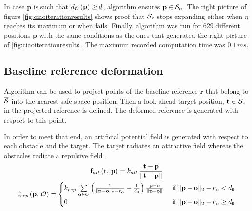 In case $\mathbf{p}$ is such that $d_{\mathcal{O}}\left(\mathbf{p}\right)\geq \underline{d}$, algorithm  ensures $\mathbf{p} \in \mathcal{S}_{\mathbf{c}}$. The right picture of figure \ref{fig:ciaoiterationresults} shows proof that $\mathcal{S}_{\mathbf{c}}$ stops expanding either when $\eta$ reaches its maximum or when  fails. Finally, algorithm  was run for 629 different positions $\mathbf{p}$ with the same conditions as the ones that generated the right picture of \ref{fig:ciaoiterationresults}. The maximum recorded computation time was $0.1\,ms$.

\subsection{Baseline reference deformation}

Algorithm  can be used to project points of the baseline reference $\mathbf{r}$ that belong to $\overline{\mathcal{S}}$ into the nearest safe space position. Then a look-ahead target position, $\mathbf{t} \in \mathcal{S}$, in the projected reference is defined. The deformed reference is generated with respect to this point.

In order to meet that end, an artificial potential field is generated with respect to each obstacle and the target. The target radiates an attractive field whereas the obstacles radiate a repulsive field \cite{chapter47handbookrobotics}.
\begin{subequations}\label{eq:potentialfield}
\begin{gather}
	\mathbf{f}_{att}\left(\mathbf{t},\,\mathbf{p}\right) = k_{att}\,	\frac{\mathbf{t} - \mathbf{p}}{\|\mathbf{t}-\mathbf{p}\|} \label{subeq:atractivefield} \\
	\mathbf{f}_{rep}\left(\mathbf{p},\,\mathcal{O}\right) = \begin{cases}
	k_{rep}\, \sum\limits_{\mathbf{o}\in\mathcal{O}} \left(\frac{1}{\|	\mathbf{p} - \mathbf{o}\|_2-r_\mathbf{o}} - \frac{1}{d_0}\right)\frac{\mathbf{p} - \mathbf{o}}{\|\mathbf{p}-\mathbf{o}\|}\;&\text{if}\;\|\mathbf{p} - \mathbf{o}\|_2-r_\mathbf{o} < d_0\\
	0\;&\text{if}\;\|\mathbf{p} - \mathbf{o}\|_2-r_\mathbf{o} \geq d_0
\end{cases}\label{subeq:repulsivefield}
\end{gather}
\end{subequations}

